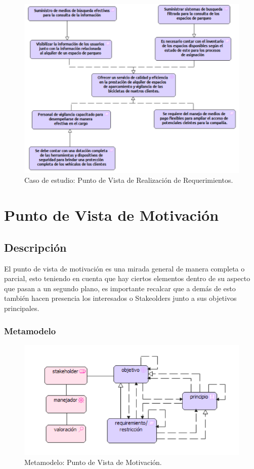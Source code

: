 \begin{figure}[h]
	\centering
	\includegraphics[width=1.0\textwidth]{imagenes/Caso_Estudio/Motivacion/Realizacion_Requerimientos.PDF}
	\caption{Caso de estudio: Punto de Vista de Realización de Requerimientos.}
	\label{fig:gap_analysis}
\end{figure}


\section{Punto de Vista de Motivación}
\subsection{Descripción}
El punto de vista de motivación es una mirada general de manera completa o parcial, esto teniendo en cuenta que hay ciertos elementos dentro de su aspecto que pasan a un segundo plano, es importante recalcar que a demás de esto también hacen presencia los interesados o Stakeolders junto a sus objetivos principales.
\subsubsection{Metamodelo}
\begin{figure}[h]
	\centering
	\includegraphics[width=1.0\textwidth]{imagenes/Metamodelos/Motivacion/meta_Motivacion.pdf}
	\caption{Metamodelo: Punto de Vista de Motivación.}
	\label{fig:gap_analysis}
\end{figure}

